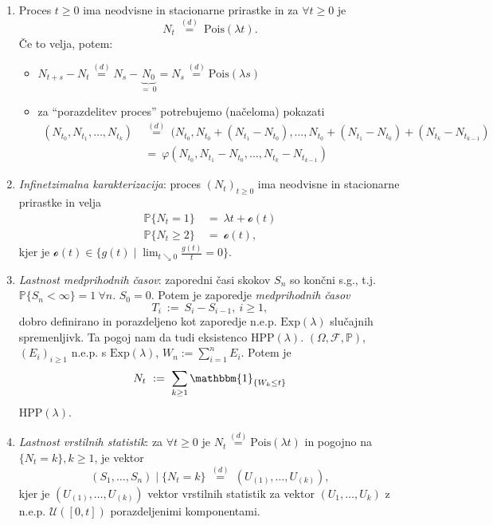 \documentclass[11pt]{article}
\renewcommand{\P}{\mathbb{P}}
\newcommand{\set}[1]{\{#1\}}
\newcommand{\1}{\mathbbm{1}}
\newcommand{\5}{\vspace{0.5cm}}
\renewcommand{\t}{{t \geq 0}}
\newcommand{\vp}{(\Omega, \F, \P)}
\newcommand{\nt}{(N_t)_\t}
\newcommand{\hpp}{\text{HPP}}
\newcommand{\poi}{\text{Pois}}
\renewcommand{\exp}{\text{Exp}}
\newcommand{\F}{\mathscr{F}}
\newcommand{\U}{\mathcal{U}}
\renewcommand{\o}{\mathscr{o}}
\theoremstyle{definition}
\theoremstyle{definition}
\theoremstyle{definition}
\theoremstyle{definition}
\begin{document}
{{\begin{enumerate}
\item Proces $\t$ ima neodvisne in stacionarne prirastke in za $\forall \t$ je
$$N_t ~\overset{(d)}{=}~ \poi(\lambda t).$$
Če to velja, potem:
\begin{itemize}
	\item $N_{t+s} - N_t \overset{(d)}{=} N_s - \underbrace{N_0}_{=~0} = N_s \overset{(d)}{=} \poi(\lambda s)$
	\item za ``porazdelitev proces'' potrebujemo (načeloma) pokazati
	\begin{align*}
	(N_{t_0}, N_{t_1},\ldots,N_{t_k}) ~&\overset{(d)}{=}~ (N_{t_0}, N_{t_0} + (N_{t_1} - N_{t_0}),\ldots,N_{t_0} + (N_{t_1} - N_{t_0}) + (N_{t_k} - N_{t_{k-1}}) \\
	&=~ \varphi(N_{t_0}, N_{t_1} - N_{t_0}, \ldots, N_{t_k} - N_{t_{k-1}})
	\end{align*}
\end{itemize}

\item \textit{Infinetzimalna karakterizacija}: proces $\nt$ ima neodvisne in stacionarne prirastke in velja
\begin{align*}
\P\set{N_t = 1} ~&=~ \lambda t + \o(t) \\
\P\set{N_t \geq 2} ~&=~ \o(t),
\end{align*}
kjer je $\o(t) \in \set{g(t) \mid \lim_{t \searrow 0} \frac{g(t)}{t} = 0}$.

\item \textit{Lastnost medprihodnih časov}: zaporedni časi skokov $S_n$ so končni s.g., t.j. $\P\set{S_n < \infty} = 1 ~\forall n$. $S_0 = 0$. Potem je zaporedje \textit{medprihodnih časov}
$$T_i ~:=~ S_i - S_{i-1}, ~i \geq 1,$$
dobro definirano in porazdeljeno kot zaporedje n.e.p. $\exp(\lambda)$ slučajnih spremenljivk. Ta pogoj nam da tudi eksistenco $\hpp(\lambda)$. $\vp$, $(E_i)_{i \geq 1}$ n.e.p. s $\exp(\lambda)$, $W_n := \sum_{i=1}^n E_i$. Potem je
$$N_t ~:=~ \sum_{k \geq 1} \1_{\set{W_k \leq t}}$$
$\hpp(\lambda)$.

\item \textit{Lastnost vrstilnih statistik}: za $\forall\t$ je $N_t \overset{(d)}{=} \poi(\lambda t)$ in pogojno na $\set{N_t = k}, k \geq 1$, je vektor
$$(S_1,\ldots,S_n) \mid \set{N_t = k} ~\overset{(d)}{=}~ (U_{(1)},\ldots,U_{(k)}),$$
kjer je $(U_{(1)},\ldots,U_{(k)})$ vektor vrstilnih statistik za vektor $(U_1,\ldots,U_k)$ z n.e.p. $\U([0,t])$ porazdeljenimi komponentami.

\end{enumerate}}
\5

}
\end{document}
